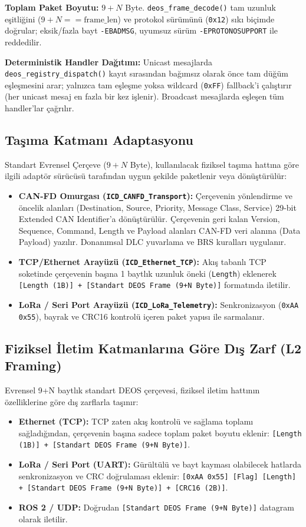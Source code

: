 \documentclass[a4paper,10pt]{article}
\newcommand{\hex}[1]{\texttt{0x#1}}
\newcommand{\code}[1]{\texttt{#1}}
\begin{document}
\textbf{Toplam Paket Boyutu:} $9 + N$ Byte. \code{deos\_frame\_decode()} tam uzunluk eşitliğini ($9 + N == \text{frame\_len}$) ve protokol sürümünü (\hex{12}) sıkı biçimde doğrular; eksik/fazla bayt \code{-EBADMSG}, uyumsuz sürüm \code{-EPROTONOSUPPORT} ile reddedilir.

\textbf{Deterministik Handler Dağıtımı:} Unicast mesajlarda \code{deos\_registry\_dispatch()} kayıt sırasından bağımsız olarak önce tam düğüm eşleşmesini arar; yalnızca tam eşleşme yoksa wildcard (\hex{FF}) fallback'i çalıştırır (her unicast mesaj en fazla bir kez işlenir). Broadcast mesajlarda eşleşen tüm handler'lar çağrılır.

\subsection{Taşıma Katmanı Adaptasyonu}

Standart Evrensel Çerçeve ($9+N$ Byte), kullanılacak fiziksel taşıma hattına göre ilgili adaptör sürücüsü tarafından uygun şekilde paketlenir veya dönüştürülür:

\begin{itemize}
    \item \textbf{CAN-FD Omurgası (\code{ICD\_CANFD\_Transport}):} Çerçevenin yönlendirme ve öncelik alanları (Destination, Source, Priority, Message Class, Service) 29-bit Extended CAN Identifier'a dönüştürülür. Çerçevenin geri kalan Version, Sequence, Command, Length ve Payload alanları CAN-FD veri alanına (Data Payload) yazılır. Donanımsal DLC yuvarlama ve BRS kuralları uygulanır.
    \item \textbf{TCP/Ethernet Arayüzü (\code{ICD\_Ethernet\_TCP}):} Akış tabanlı TCP soketinde çerçevenin başına 1 baytlık uzunluk öneki (\code{Length}) eklenerek \code{[Length (1B)] + [Standart DEOS Frame (9+N Byte)]} formatında iletilir.
    \item \textbf{LoRa / Seri Port Arayüzü (\code{ICD\_LoRa\_Telemetry}):} Senkronizasyon (\hex{AA} \hex{55}), bayrak ve CRC16 kontrolü içeren paket yapısı ile sarmalanır.
\end{itemize}

\subsection{Fiziksel İletim Katmanlarına Göre Dış Zarf (L2 Framing)}

Evrensel 9+N baytlık standart DEOS çerçevesi, fiziksel iletim hattının özelliklerine göre dış zarflarla taşınır:
\begin{itemize}
    \item \textbf{Ethernet (TCP):} TCP zaten akış kontrolü ve sağlama toplamı sağladığından, çerçevenin başına sadece toplam paket boyutu eklenir: \code{[Length (1B)] + [Standart DEOS Frame (9+N Byte)]}.
    \item \textbf{LoRa / Seri Port (UART):} Gürültülü ve bayt kayması olabilecek hatlarda senkronizasyon ve CRC doğrulaması eklenir: \code{[0xAA 0x55] [Flag] [Length] + [Standart DEOS Frame (9+N Byte)] + [CRC16 (2B)]}.
    \item \textbf{ROS 2 / UDP:} Doğrudan \code{[Standart DEOS Frame (9+N Byte)]} datagram olarak iletilir.
\end{itemize}
\end{document}
